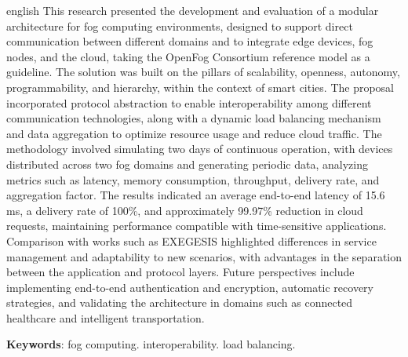 \begin{resumo}[Abstract]
	\SingleSpacing
	\begin{otherlanguage*}{english}
		This research presented the development and evaluation of a modular architecture for fog computing environments, designed to support direct communication between different domains and to integrate edge devices, fog nodes, and the cloud, taking the OpenFog Consortium reference model as a guideline. The solution was built on the pillars of scalability, openness, autonomy, programmability, and hierarchy, within the context of smart cities. The proposal incorporated protocol abstraction to enable interoperability among different communication technologies, along with a dynamic load balancing mechanism and data aggregation to optimize resource usage and reduce cloud traffic. The methodology involved simulating two days of continuous operation, with devices distributed across two fog domains and generating periodic data, analyzing metrics such as latency, memory consumption, throughput, delivery rate, and aggregation factor. The results indicated an average end-to-end latency of 15.6 ms, a delivery rate of 100\%, and approximately 99.97\% reduction in cloud requests, maintaining performance compatible with time-sensitive applications. Comparison with works such as EXEGESIS highlighted differences in service management and adaptability to new scenarios, with advantages in the separation between the application and protocol layers. Future perspectives include implementing end-to-end authentication and encryption, automatic recovery strategies, and validating the architecture in domains such as connected healthcare and intelligent transportation.

		\textbf{Keywords}: fog computing. interoperability. load balancing.
	\end{otherlanguage*}
\end{resumo}


% 
%
%  


